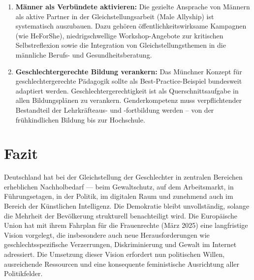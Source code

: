 \documentclass[12pt,a4paper]{article}
\begin{document}
\begin{enumerate}[label=\arabic*.]
		\item \textbf{Männer als Verbündete aktivieren:} Die gezielte Ansprache von Männern als aktive Partner in der Gleichstellungsarbeit (Male Allyship) ist systematisch auszubauen. Dazu gehören öffentlichkeitswirksame Kampagnen (wie HeForShe), niedrigschwellige Workshop-Angebote zur kritischen Selbstreflexion sowie die Integration von Gleichstellungsthemen in die männliche Berufs- und Gesundheitsberatung.
		
		\item \textbf{Geschlechtergerechte Bildung verankern:} Das Münchner Konzept für geschlechtergerechte Pädagogik sollte als Best-Practice-Beispiel bundesweit adaptiert werden. Geschlechtergerechtigkeit ist als Querschnittsaufgabe in allen Bildungsplänen zu verankern. Genderkompetenz muss verpflichtender Bestandteil der Lehrkräfteaus- und -fortbildung werden – von der frühkindlichen Bildung bis zur Hochschule.
	\end{enumerate}
	
	\section{Fazit}
	
	Deutschland hat bei der Gleichstellung der Geschlechter in zentralen Bereichen erheblichen Nachholbedarf — beim Gewaltschutz, auf dem Arbeitsmarkt, in Führungsetagen, in der Politik, im digitalen Raum und zunehmend auch im Bereich der Künstlichen Intelligenz. Die Demokratie bleibt unvollständig, solange die Mehrheit der Bevölkerung strukturell benachteiligt wird. Die Europäische Union hat mit ihrem Fahrplan für die Frauenrechte (März 2025) eine langfristige Vision vorgelegt, die insbesondere auch neue Herausforderungen wie geschlechtsspezifische Verzerrungen, Diskriminierung und Gewalt im Internet adressiert. Die Umsetzung dieser Vision erfordert nun politischen Willen, ausreichende Ressourcen und eine konsequente feministische Ausrichtung aller Politikfelder.
	
	\newpage
	
\end{document}
